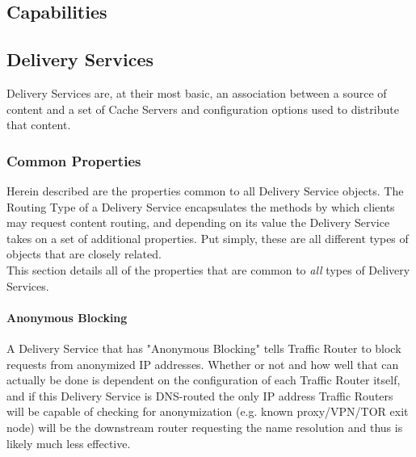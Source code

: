 \subsection{Capabilities}


\subsection{Delivery Services}
Delivery Services are, at their most basic, an association between a source of
content and a set of Cache Servers and configuration options used to distribute
that content.

\subsubsection{Common Properties}
Herein described are the properties common to all Delivery Service objects. The
Routing Type of a Delivery Service encapsulates the methods by which clients
may request content routing, and depending on its value the Delivery Service
takes on a set of additional properties. Put simply, these are all different
types of objects that are closely related.\\
This section details all of the properties that are common to \emph{all} types
of Delivery Services.

\paragraph{Anonymous Blocking}
A Delivery Service that has "Anonymous Blocking" tells Traffic Router to block
requests from anonymized IP addresses. Whether or not and how well that can
actually be done is dependent on the configuration of each Traffic Router
itself, and if this Delivery Service is DNS-routed the only IP address Traffic
Routers will be capable of checking for anonymization (e.g. known proxy/VPN/TOR
exit node) will be the downstream router requesting the name resolution and thus
is likely much less effective.

